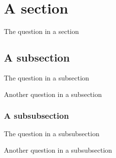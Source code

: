 \documentclass{article}
\newcounter{question}
\begin{document}

    \section{A section}

    \begin{question}
        The question in a section
    \end{question}

    \subsection{A subsection}

    \begin{question}
        The question in a subsection
    \end{question}

    \begin{question}[number = 7]
        Another question in a subsection
    \end{question}

    \subsubsection{A subsubsection}

    \begin{question}\label{qu:test}
        The question in a subsubsection
    \end{question}

    \begin{question}
        Another question in a subsubsection
    \end{question}
\end{document}
